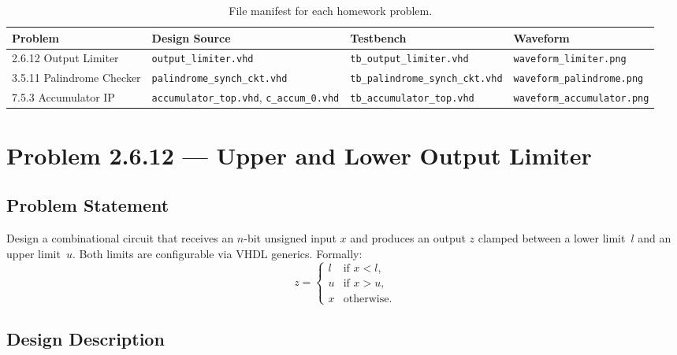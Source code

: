 \documentclass[12pt]{article}
\begin{document}
\begin{table}[H]
\centering
\caption{File manifest for each homework problem.}
\label{tab:manifest}
\begin{adjustbox}{max width=\textwidth}
\begin{tabular}{@{}llll@{}}
\toprule
\textbf{Problem} & \textbf{Design Source} & \textbf{Testbench} & \textbf{Waveform} \\
\midrule
2.6.12 Output Limiter
  & \texttt{output\_limiter.vhd}
  & \texttt{tb\_output\_limiter.vhd}
  & \texttt{waveform\_limiter.png} \\[4pt]
3.5.11 Palindrome Checker
  & \texttt{palindrome\_synch\_ckt.vhd}
  & \texttt{tb\_palindrome\_synch\_ckt.vhd}
  & \texttt{waveform\_palindrome.png} \\[4pt]
7.5.3 Accumulator IP
  & \texttt{accumulator\_top.vhd}, \texttt{c\_accum\_0.vhd}
  & \texttt{tb\_accumulator\_top.vhd}
  & \texttt{waveform\_accumulator.png} \\
\bottomrule
\end{tabular}
\end{adjustbox}
\end{table}

\section{Problem 2.6.12 --- Upper and Lower Output Limiter}
\label{sec:limiter}

\subsection{Problem Statement}

Design a combinational circuit that receives an $n$-bit unsigned input
$x$ and produces an output $z$ clamped between a lower limit~$l$ and an
upper limit~$u$. Both limits are configurable via VHDL generics.
Formally:
\begin{equation}
  z = \begin{cases}
        l & \text{if } x < l,\\
        u & \text{if } x > u,\\
        x & \text{otherwise.}
      \end{cases}
  \label{eq:limiter}
\end{equation}

\subsection{Design Description}
\end{document}
